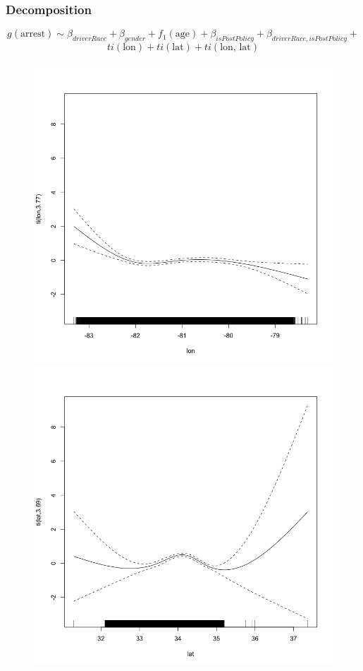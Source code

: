 \documentclass{beamer}
\begin{document}
\begin{frame}
\frametitle{Decomposition}



$$g(\text{arrest}) \sim \beta_{driverRace} +  \beta_{gender} + f_1(\text{age}) +\beta_{isPostPolicy}+ \beta_{driverRace, isPostPolicy}+$$
$$ ti(\text{lon}) + ti(\text{lat})+ ti(\text{lon, lat})$$



\begin{figure}
\includegraphics[scale=.2]{figures/lon}
\includegraphics[scale=.2]{figures/lat}


\end{figure}
\end{frame}
\end{document}

